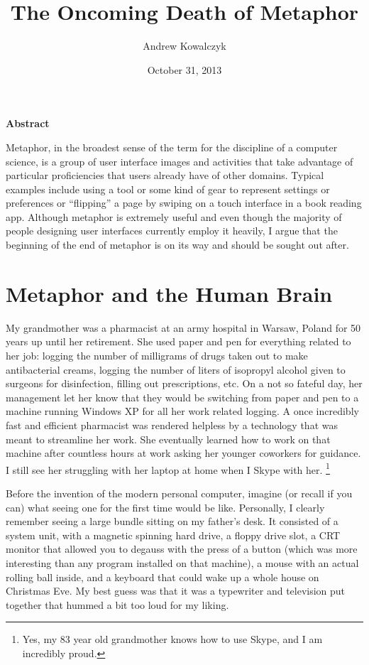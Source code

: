 \documentclass[11pt, oneside]{article}   	%
\title{The Oncoming Death of Metaphor}
\author{Andrew Kowalczyk}
\date{October 31, 2013}							%
\begin{document}
\maketitle
\centerline{\textbf{Abstract}}
Metaphor, in the broadest sense of the term for the discipline of a computer science, is a group of user interface images and activities that take advantage of particular proficiencies that users already have of other domains. Typical examples include using a tool or some kind of gear to represent settings or preferences or ``flipping'' a page by swiping on a touch interface in a book reading app. Although metaphor is extremely useful and even though the majority of people designing user interfaces currently employ it heavily, I argue that the beginning of the end of metaphor is on its way and should be sought out after.

\pagebreak
\section{Metaphor and the Human Brain} 
My grandmother was a pharmacist at an army hospital in Warsaw, Poland for 50 years up until her retirement. She used paper and pen for everything related to her job: logging the number of milligrams of drugs taken out to make antibacterial creams, logging the number of liters of isopropyl alcohol given to surgeons for disinfection, filling out prescriptions, etc. On a not so fateful day, her management let her know that they would be switching from paper and pen to a machine running Windows XP for all her work related logging. A once incredibly fast and efficient pharmacist was rendered helpless by a technology that was meant to streamline her work. She eventually learned how to work on that machine after countless hours at work asking her younger coworkers for guidance. I still see her struggling with her laptop at home when I Skype with her. \footnote{Yes, my 83 year old grandmother knows how to use Skype, and I am incredibly proud.}

Before the invention of the modern personal computer, imagine (or recall if you can) what seeing one for the first time would be like.
Personally, I clearly remember seeing a large bundle sitting on my father's desk. It consisted of a system unit, with a magnetic spinning hard drive, a floppy drive slot, a CRT monitor that allowed you to degauss with the press of a button (which was more interesting than any program installed on that machine), a mouse with an actual rolling ball inside, and a keyboard that could wake up a whole house on Christmas Eve. My best guess was that it was a typewriter and television put together that hummed a bit too loud for my liking.
\end{document}
